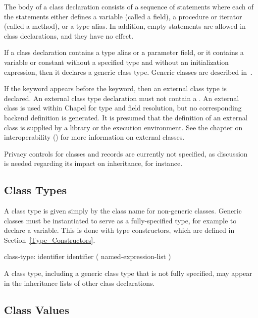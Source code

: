 The body of a class declaration consists of a sequence of statements
where each of the statements either defines a variable (called a
field), a procedure or iterator (called a method), or a type alias.  In addition, empty
statements are allowed in class declarations, and they have no effect.

If a class declaration contains a type alias or a parameter field, or it contains a variable or
constant without a specified type and without an initialization
expression, then it declares a generic class type.  Generic classes are described
in~.

If the  keyword appears before the  keyword, then an
external class type is declared.  An external class type declaration must not
contain a .  An external class is used within Chapel
for type and field resolution, but no corresponding backend definition is
generated.  It is presumed that the definition of an external class is supplied
by a library or the execution environment.  See the chapter on interoperability
() for more information on external classes.

\begin{future}
Privacy controls for classes and records are currently not specified,
as discussion is needed regarding its impact on inheritance, for
instance.
\end{future}

\subsection{Class Types}
\label{Class_Types}

A class type is given simply by the class name for non-generic classes.
Generic classes must be instantiated to serve as a fully-specified
type, for example to declare a variable.  This is done with
type constructors, which are defined in Section~\ref{Type_Constructors}.

\begin{syntax}
class-type:
  identifier
  identifier ( named-expression-list )
\end{syntax}

A class type, including a generic class type that is not
fully specified, may appear in the inheritance lists
of other class declarations.

\subsection{Class Values}
\label{Class_Values}

